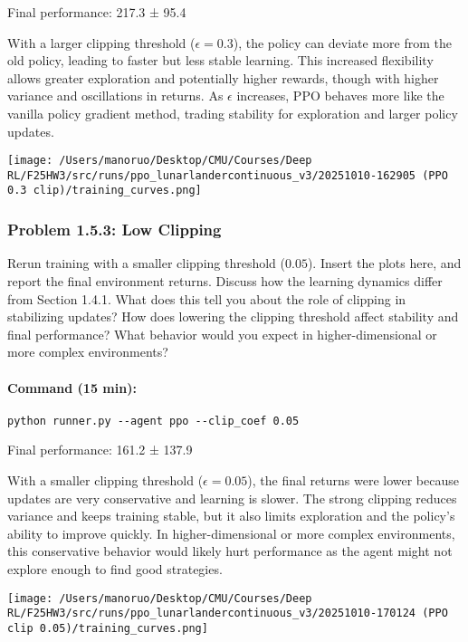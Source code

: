 \documentclass[12pt]{article}
\begin{document}
\begin{solution}[height=10cm]
Final performance: 217.3 ± 95.4

With a larger clipping threshold ($\epsilon = 0.3$), the policy can deviate more from the old policy, leading to faster but less stable learning. This increased flexibility allows greater exploration and potentially higher rewards, though with higher variance and oscillations in returns. As $\epsilon$ increases, PPO behaves more like the vanilla policy gradient method, trading stability for exploration and larger policy updates.

 \centering
    \texttt{[image: /Users/manoruo/Desktop/CMU/Courses/Deep RL/F25HW3/src/runs/ppo\_lunarlandercontinuous\_v3/20251010-162905 (PPO 0.3 clip)/training\_curves.png]}
    \label{fig:ppo_clip_.3}

\end{solution}

\subsubsection*{Problem 1.5.3: Low Clipping}
Rerun training with a smaller clipping threshold ($0.05$). Insert the plots here, and report the final environment returns.  Discuss how the learning dynamics differ from Section 1.4.1. What does this tell you about the role of clipping in stabilizing updates? How does lowering the clipping threshold affect stability and final performance? What behavior would you expect in higher-dimensional or more complex environments?

\paragraph{Command (15 min):}
\begin{verbatim}
python runner.py --agent ppo --clip_coef 0.05
\end{verbatim}

\begin{solution}[height=12cm]

Final performance: 161.2 ± 137.9

With a smaller clipping threshold ($\epsilon = 0.05$), 
the final returns were lower because updates are very conservative and 
learning is slower. 
The strong clipping reduces variance and keeps training stable, 
but it also limits exploration and the policy’s ability to improve quickly. In higher-dimensional or more complex environments, this conservative behavior would likely hurt performance as the agent might not explore enough to find good strategies.
 
\centering
    \texttt{[image: /Users/manoruo/Desktop/CMU/Courses/Deep RL/F25HW3/src/runs/ppo\_lunarlandercontinuous\_v3/20251010-170124 (PPO clip 0.05)/training\_curves.png]}
    \label{fig:ppo_clip_.05}
\end{solution}
\end{document}
